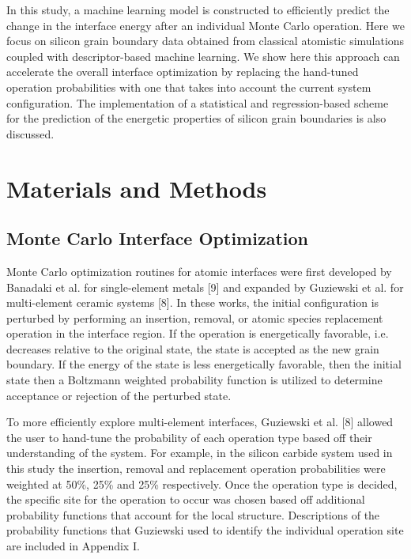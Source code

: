 \documentclass[aip,reprint,longbibliography,amsmath,amssymb,twocolumn,superscriptaddress]{revtex4-1}
\begin{document}
In this study, a machine learning model is constructed to efficiently predict the change in the interface energy after an individual Monte Carlo operation. 
%
Here we focus on silicon grain boundary data obtained from classical atomistic simulations coupled with descriptor-based machine learning. 
%
We show here this approach can accelerate the overall interface optimization by replacing the hand-tuned operation probabilities with one that takes into account the current system configuration. %
%
The implementation of a statistical and regression-based scheme for the prediction of the energetic properties of silicon grain boundaries is also discussed. 
%

\section{Materials and Methods}
\subsection{Monte Carlo Interface Optimization}

Monte Carlo optimization routines for atomic interfaces were first developed by Banadaki et al. for single-element metals [9] and expanded by Guziewski et al. for multi-element ceramic systems [8].  
%
In these works, the initial configuration is perturbed by performing an insertion, removal, or atomic species replacement operation in the interface region. 
%
If the operation is energetically favorable, i.e. decreases relative to the original state, the state is accepted as the new grain boundary. 
%
If the energy of the state is less energetically favorable, then the initial state then a Boltzmann weighted probability function is utilized to determine acceptance or rejection of the perturbed state. 


To more efficiently explore multi-element interfaces, Guziewski et al. [8] allowed the user to hand-tune the probability of each operation type based off their understanding of the system. 
%
For example, in the silicon carbide system used in this study the insertion, removal and replacement operation probabilities were weighted at 50\%, 25\% and 25\% respectively. 
%
Once the operation type is decided, the specific site for the operation to occur was chosen based off additional probability functions that account for the local structure.  
%
Descriptions of the probability functions that Guziewski used to identify the individual operation site are included in Appendix I.  
\end{document}
